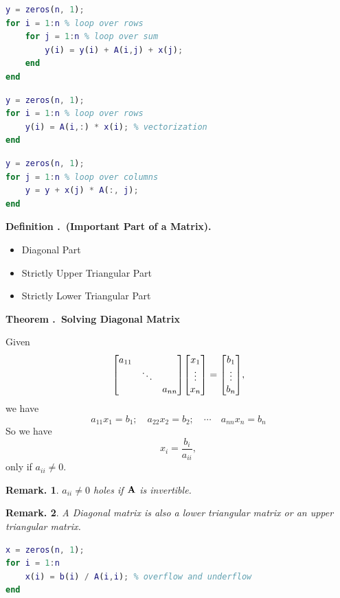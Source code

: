 \documentclass[12pt, a4paper]{article}
\newcounter{index}[subsection]
\newenvironment*{df}[1]{\par\noindent\textbf{Definition \thesubsection.\stepcounter{index}\theindex\ (#1).}}{\par}
\newenvironment*{thm}[1]{\begin{tcolorbox}\par\noindent\textbf{Theorem \thesubsection.\stepcounter{index}\theindex\ #1} \par}{\par\end{tcolorbox}}
\newtheorem{rmk}{Remark.}[section]
\def\A{\vb A}
\begin{document}
\begin{lstlisting}[language = Matlab, title = {Row-Wise Vector Multiplication}]
y = zeros(n, 1);
for i = 1:n % loop over rows
	for j = 1:n % loop over sum
		y(i) = y(i) + A(i,j) + x(j);
	end
end
\end{lstlisting}
\begin{lstlisting}[language = Matlab, title = {Row-Wise Vector Multiplication (Vectorization)}]
y = zeros(n, 1);
for i = 1:n % loop over rows
	y(i) = A(i,:) * x(i); % vectorization
end
\end{lstlisting}
\begin{lstlisting}[language = Matlab, title = {Column-Wise Vector Multiplication}]
y = zeros(n, 1);
for j = 1:n % loop over columns
	y = y + x(j) * A(:, j);
end
\end{lstlisting}
\begin{df}{Important Part of a Matrix}
	\begin{itemize}
		\item Diagonal Part
		\item Strictly Upper Triangular Part
		\item Strictly Lower Triangular Part
	\end{itemize}	
\end{df}
\begin{thm}{Solving Diagonal Matrix}
	Given \[\mqty[a_{11}&&\\&\ddots&\\&&a_{nn}]\mqty[x_1\\\vdots\\x_n]=\mqty[b_1\\\vdots\\b_n],\] we have \[a_{11}x_1=b_1;\quad a_{22}x_2=b_2;\quad\cdots\quad a_{nn}x_n=b_n\] So we have \[x_i=\dfrac{b_i}{a_{ii}},\] only if $a_{ii}\neq0.$
	\begin{rmk}$a_{ii}\neq0$ holes if $\A$ is invertible. \end{rmk}
\end{thm}
\begin{rmk}A Diagonal matrix is also a lower triangular matrix or an upper triangular matrix. \end{rmk}
\begin{lstlisting}[language = Matlab, title = {Solving Diagonal Matrix}]
x = zeros(n, 1);
for i = 1:n
	x(i) = b(i) / A(i,i); % overflow and underflow
end
\end{lstlisting}
\end{document}
